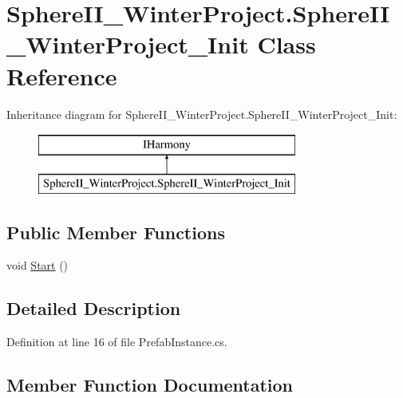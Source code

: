 \hypertarget{class_sphere_i_i___winter_project_1_1_sphere_i_i___winter_project___init}{}\section{Sphere\+I\+I\+\_\+\+Winter\+Project.\+Sphere\+I\+I\+\_\+\+Winter\+Project\+\_\+\+Init Class Reference}
\label{class_sphere_i_i___winter_project_1_1_sphere_i_i___winter_project___init}
Inheritance diagram for Sphere\+I\+I\+\_\+\+Winter\+Project.\+Sphere\+I\+I\+\_\+\+Winter\+Project\+\_\+\+Init\+:\begin{figure}[H]
\begin{center}
\leavevmode
\includegraphics[height=2.000000cm]{class_sphere_i_i___winter_project_1_1_sphere_i_i___winter_project___init}
\end{center}
\end{figure}
\subsection*{Public Member Functions}
\begin{DoxyCompactItemize}
\item 
void \mbox{\hyperlink{class_sphere_i_i___winter_project_1_1_sphere_i_i___winter_project___init_a45c25ac266897ab32099235e37f2a526}{Start}} ()
\end{DoxyCompactItemize}


\subsection{Detailed Description}


Definition at line 16 of file Prefab\+Instance.\+cs.



\subsection{Member Function Documentation}
\mbox{\label{class_sphere_i_i___winter_project_1_1_sphere_i_i___winter_project___init_a45c25ac266897ab32099235e37f2a526}} 
